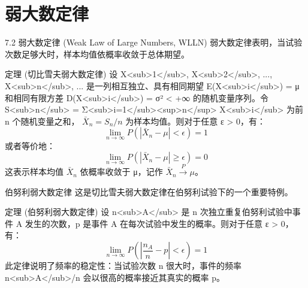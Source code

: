 \documentclass[UTF8]{beamer} %
\begin{document}
\section{弱大数定律}
\begin{frame}{7.2 弱大数定律 (Weak Law of Large Numbers, WLLN)}
    弱大数定律表明，当试验次数足够大时，样本均值\alert{依概率收敛}于总体期望。
    \vspace{0.5cm}

    \begin{block}{定理 (切比雪夫弱大数定律)}
        设 X<sub>1</sub>, X<sub>2</sub>, ..., X<sub>n</sub>, ... 是一列\alert{相互独立}、具有\alert{相同期望} E(X<sub>i</sub>) = μ 和\alert{相同有限方差} D(X<sub>i</sub>) = σ² < +∞ 的随机变量序列。令 S<sub>n</sub> = Σ<sub>i=1</sub><sup>n</sup> X<sub>i</sub> 为前 n 个随机变量之和， \( \bar{X}_n = S_n / n \) 为样本均值。则对于任意 ε > 0，有：
        \[ \lim_{n \to \infty} P(|\bar{X}_n - \mu| < \epsilon) = 1 \]
        或者等价地：
        \[ \lim_{n \to \infty} P(|\bar{X}_n - \mu| \geq \epsilon) = 0 \]
        这表示样本均值 \( \bar{X}_n \) \alert{依概率收敛}于 μ，记作 \( \bar{X}_n \xrightarrow{P} \mu \)。
    \end{block}
\end{frame}

\begin{frame}{伯努利弱大数定律}
    这是切比雪夫弱大数定律在伯努利试验下的一个重要特例。
    \vspace{0.5cm}
    \begin{block}{定理 (伯努利弱大数定律)}
        设 n<sub>A</sub> 是 n 次独立重复伯努利试验中事件 A 发生的次数，p 是事件 A 在每次试验中发生的概率。则对于任意 ε > 0，有：
        \[ \lim_{n \to \infty} P\left(\left| \frac{n_A}{n} - p \right| < \epsilon\right) = 1 \]
        此定律说明了\alert{频率的稳定性}：当试验次数 n 很大时，事件的频率 n<sub>A</sub>/n 会以很高的概率接近其真实的概率 p。
    \end{block}
\end{frame}
\end{document}
